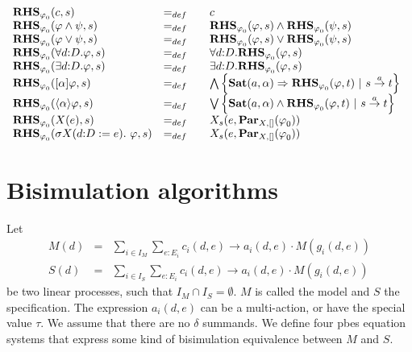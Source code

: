 \documentclass{article}
\begin{document}
$%
\begin{array}{lll}
{\mathbf{RHS}}_{\varphi _{0}}(c,s) & =_{def} & c \\ 
{\mathbf{RHS}}_{\varphi _{0}}(\varphi \wedge \psi ,s) & =_{def} & {\mathbf{%
RHS}}_{\varphi _{0}}(\varphi ,s)\wedge {\mathbf{RHS}}_{\varphi _{0}}(\psi ,s)
\\ 
{\mathbf{RHS}}_{\varphi _{0}}(\varphi \vee \psi ,s) & =_{def} & {\mathbf{RHS}%
}_{\varphi _{0}}(\varphi ,s)\vee {\mathbf{RHS}}_{\varphi _{0}}(\psi ,s) \\ 
{\mathbf{RHS}}_{\varphi _{0}}(\forall d{{:}D}.\varphi ,s) & =_{def} & 
\forall d{{:}D}.{\mathbf{RHS}}_{\varphi _{0}}(\varphi ,s) \\ 
{\mathbf{RHS}}_{\varphi _{0}}(\exists d{{:}D}.\varphi ,s) & =_{def} & 
\exists d{{:}D}.{\mathbf{RHS}}_{\varphi _{0}}(\varphi ,s) \\ 
{\mathbf{RHS}}_{\varphi _{0}}([\alpha ]\varphi ,s) & =_{def} & \bigwedge
\left\{ \mathbf{Sat}(a,\alpha )\Rightarrow {\mathbf{RHS}}_{\varphi
_{0}}(\varphi ,t)\ |\ s\overset{a}{\rightarrow }t\right\} \\ 
{\mathbf{RHS}}_{\varphi _{0}}(\langle \alpha \rangle \varphi ,s) & =_{def} & 
\bigvee \left\{ \mathbf{Sat}(a,\alpha )\wedge {\mathbf{RHS}}_{\varphi
_{0}}(\varphi ,t)\ |\ s\overset{a}{\rightarrow }t\right\} \\ 
{\mathbf{RHS}}_{\varphi _{0}}(X(e),s) & =_{def} & X_{s}(e,\mathbf{Par}%
_{X,[]}(\varphi _{0})) \\ 
{\mathbf{RHS}}_{\varphi _{0}}(\sigma X(d{:}D:=e).~\varphi ,s) & =_{def}~~~ & 
X_{s}(e,\mathbf{Par}_{X,[]}(\varphi _{0}))%
\end{array}%
$\pagebreak

\section{Bisimulation algorithms}

Let%
\begin{eqnarray*}
M(d) &=&\sum\limits_{i\in I_{M}}\sum_{e:E_{i}}c_{i}(d,e)\rightarrow
a_{i}(d,e)\cdot M(g_{i}(d,e)) \\
S(d) &=&\sum\limits_{i\in I_{S}}\sum_{e:E_{i}}c_{i}(d,e)\rightarrow
a_{i}(d,e)\cdot M(g_{i}(d,e))
\end{eqnarray*}%
be two linear processes, such that $I_{M}\cap I_{S}=\emptyset $. $M$ is
called the model and $S$ the specification. The expression $a_{i}(d,e)$ can
be a multi-action, or have the special value $\tau $. We assume that there
are no $\delta $ summands. We define four pbes equation systems that express
some kind of bisimulation equivalence between $M$ and $S$.
\end{document}

